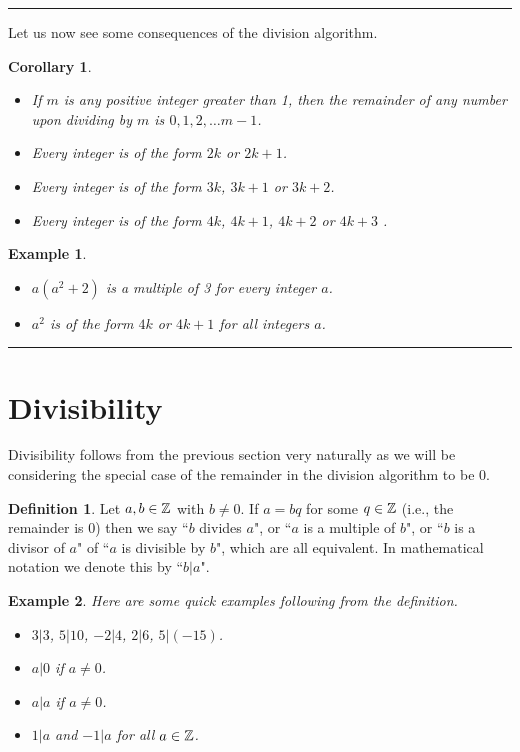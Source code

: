 \documentclass[12pt]{article}
\theoremstyle{plain}
\newtheorem{corollary}{Corollary}
\newtheorem{example}{Example}
\theoremstyle{definition}
\newtheorem{definition}{Definition}
\theoremstyle{remark}
\begin{document}
\bigskip
\hrule

\bigskip 
\noindent
Let us now see some consequences of the division algorithm. 
\begin{corollary}
    \begin{itemize}
        \item If $m$ is any positive integer greater than 1, then the remainder of any number upon dividing by $m$ is $0, 1, 2, \dots m-1$. 
        \item Every integer is of the form $2k$ or $2k+1$.
        \item Every integer is of the form $3k$, $3k+1$ or $3k+2$.
        \item Every integer is of the form $4k$, $4k+1$, $4k+2$ or $4k+3$
.    \end{itemize}
\end{corollary}

\bigskip
\noindent
\begin{example}
\begin{itemize}
    \item $a(a^2+2)$ is a multiple of 3 for every integer $a$. 
    \item $a^2$ is of the form $4k$ or $4k+1$ for all integers $a$.
\end{itemize}
    
\end{example}


\bigskip
\hrule

	\section{Divisibility}
Divisibility follows from the previous section very naturally as we will be considering the special case of the remainder in the division algorithm to be 0.

\begin{definition}
    Let $a,b \in \mathbb{Z}$ with $b\neq 0$. If $a=bq$ for some $q\in \mathbb{Z}$ (i.e., the remainder is 0) then we say ``$b$ divides $a$", or ``$a$ is a multiple of $b$", or ``$b$ is a divisor of $a$" of ``$a$ is divisible by $b$", which are all equivalent. In mathematical notation we denote this by ``$b|a$".
\end{definition}
\begin{example}
Here are some quick examples following from the definition. 
\begin{itemize}
    \item $3|3$,  \:\:\:\: $5|10$, \:\:\:\: $-2|4$, \:\:\:\: $2|6$, \:\:\:\: $5|(-15)$.
    \item $a|0$ if $a\neq 0$.
    \item $a|a$ if $a\neq 0$.
    \item $1|a$ and $-1|a$ for all $a\in \mathbb{Z}$.
\end{itemize}
\end{example}
\end{document}
